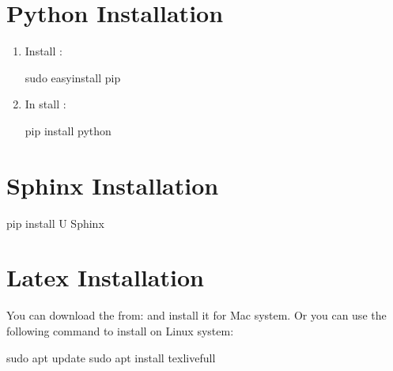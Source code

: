 \documentclass[letterpaper,11pt,english]{sphinxmanual}
\begin{document}
\section{Python Installation}
\label{\detokenize{pkgs:python-installation}}\begin{enumerate}
\def\theenumi{\arabic{enumi}}
\def\labelenumi{\theenumi .}
\makeatletter\def\p@enumii{\p@enumi \theenumi .}\makeatother
\item {} 
Install :

\begin{sphinxVerbatim}[commandchars=\\\{\}]
sudo easy\PYGZus{}install pip
\end{sphinxVerbatim}

\item {} 
In stall :

\begin{sphinxVerbatim}[commandchars=\\\{\}]
pip install python
\end{sphinxVerbatim}

\end{enumerate}


\section{Sphinx Installation}
\label{\detokenize{pkgs:sphinx-installation}}
\begin{sphinxVerbatim}[commandchars=\\\{\}]
pip install \PYGZhy{}U Sphinx
\end{sphinxVerbatim}


\section{Latex Installation}
\label{\detokenize{pkgs:latex-installation}}
You can download the  from:  and install it for Mac system. Or you can use the following command to install  on Linux system:

\begin{sphinxVerbatim}[commandchars=\\\{\}]
sudo apt update  sudo apt install texlive\PYGZhy{}full
\end{sphinxVerbatim}
\end{document}
